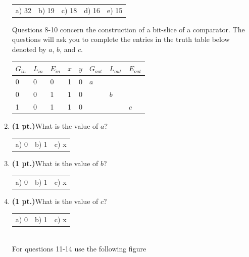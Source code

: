 \documentclass{article}
\begin{document}
\begin{enumerate}
\begin{tabular}{p{0.6in} p{0.6in} p{0.6in} p{0.6in} l}
a) 32 & b) 19 & c) 18 & d) 16 & e) 15
\end{tabular}

\pagebreak
Questions 8-10 concern the construction of a bit-slice of a comparator.  The questions 
will ask you to complete the entries in the truth table below denoted by $a$, $b$, and
$c$.

\begin{tabular}{l|l|l|l|l||l|l|l}
$G_{in}$ & $L_{in}$ & $E_{in}$ & $x$ & $y$ & $G_{out}$ & $L_{out}$ & $E_{out}$ \\ \hline
    0    &    0     &     0    &  1  &  0  &   $a$     &           &           \\ \hline
    0    &    0     &     1    &  1  &  0  &           &   $b$     &           \\ \hline
    1    &    0     &     1    &  1  &  0  &           &           &    $c$    \\
\end{tabular}

\item {\bf (1 pt.)}What is the value of $a$?

\begin{tabular}{p{0.6in} p{0.6in} p{0.6in}}
a) 0 & b) 1 & c) x 
\end{tabular}

\item {\bf (1 pt.)}What is the value of $b$?

\begin{tabular}{p{0.6in} p{0.6in} p{0.6in}}
a) 0 & b) 1 & c) x 
\end{tabular}

\item {\bf (1 pt.)}What is the value of $c$?

\begin{tabular}{p{0.6in} p{0.6in} p{0.6in}}
a) 0 & b) 1 & c) x 
\end{tabular} \\

For questions 11-14 use the following figure


\end{enumerate}
\end{document}
